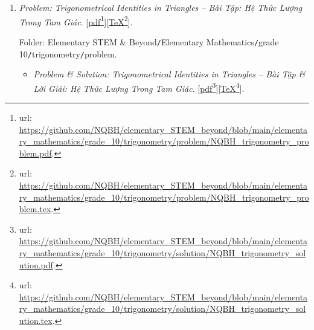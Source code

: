 \documentclass[12pt,twoside]{book}
\begin{document}
\begin{enumerate}
	Folder: {\sf Elementary STEM \& Beyond{\tt/}Elementary Mathematics{\tt/}grade 10{\tt/}function graph{\tt/}problem}.
	\begin{itemize}
		\item {\it Problem \& Solution: Function \& Graph  -- Bài Tập \& Lời Giải: Hàm Số \& Đồ Thị}. [\href{https://github.com/NQBH/elementary_STEM_beyond/blob/main/elementary_mathematics/grade_10/function_graph/solution/NQBH_function_graph_solution.pdf}{pdf}\footnote{{\sc url}: \url{https://github.com/NQBH/elementary_STEM_beyond/blob/main/elementary_mathematics/grade_10/function_graph/solution/NQBH_function_graph_solution.pdf}.}][\href{https://github.com/NQBH/elementary_STEM_beyond/blob/main/elementary_mathematics/grade_10/function_graph/solution/NQBH_function_graph_solution.tex}{\TeX}\footnote{{\sc url}: \url{https://github.com/NQBH/elementary_STEM_beyond/blob/main/elementary_mathematics/grade_10/function_graph/solution/NQBH_function_graph_solution.tex}.}].
		
		Folder: {\sf Elementary STEM \& Beyond{\tt/}Elementary Mathematics{\tt/}grade 10{\tt/}function graph{\tt/}solution}.
	\end{itemize}
	\item {\it Problem: Trigonometrical Identities in Triangles -- Bài Tập: Hệ Thức Lượng Trong Tam Giác}. [\href{https://github.com/NQBH/elementary_STEM_beyond/blob/main/elementary_mathematics/grade_10/trigonometry/problem/NQBH_trigonometry_problem.pdf}{pdf}\footnote{{\sc url}: \url{https://github.com/NQBH/elementary_STEM_beyond/blob/main/elementary_mathematics/grade_10/trigonometry/problem/NQBH_trigonometry_problem.pdf}.}][\href{https://github.com/NQBH/elementary_STEM_beyond/blob/main/elementary_mathematics/grade_10/trigonometry/problem/NQBH_trigonometry_problem.tex}{\TeX}\footnote{{\sc url}: \url{https://github.com/NQBH/elementary_STEM_beyond/blob/main/elementary_mathematics/grade_10/trigonometry/problem/NQBH_trigonometry_problem.tex}.}].
	
	Folder: {\sf Elementary STEM \& Beyond{\tt/}Elementary Mathematics{\tt/}grade 10{\tt/}trigonometry{\tt/}problem}.
	\begin{itemize}
		\item {\it Problem \& Solution: Trigonometrical Identities in Triangles -- Bài Tập \& Lời Giải: Hệ Thức Lượng Trong Tam Giác}. [\href{https://github.com/NQBH/elementary_STEM_beyond/blob/main/elementary_mathematics/grade_10/trigonometry/solution/NQBH_trigonometry_solution.pdf}{pdf}\footnote{{\sc url}: \url{https://github.com/NQBH/elementary_STEM_beyond/blob/main/elementary_mathematics/grade_10/trigonometry/solution/NQBH_trigonometry_solution.pdf}.}][\href{https://github.com/NQBH/elementary_STEM_beyond/blob/main/elementary_mathematics/grade_10/trigonometry/solution/NQBH_trigonometry_solution.tex}{\TeX}\footnote{{\sc url}: \url{https://github.com/NQBH/elementary_STEM_beyond/blob/main/elementary_mathematics/grade_10/trigonometry/solution/NQBH_trigonometry_solution.tex}.}].
		

\end{itemize}
\end{enumerate}
\end{document}
